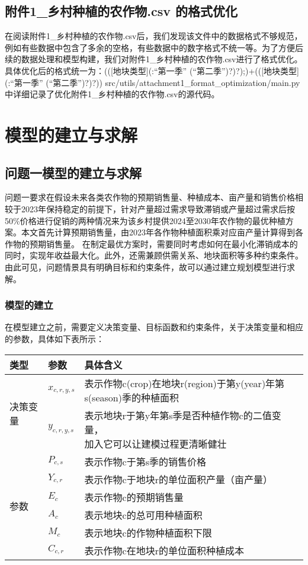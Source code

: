 \documentclass{cumcmthesis}
\begin{document}
\subsection{附件1\_乡村种植的农作物.csv 的格式优化}
在阅读附件1\_乡村种植的农作物.csv后，我们发现该文件中的数据格式不够规范，例如有些数据中包含了多余的空格，有些数据中的数字格式不统一等。为了方便后续的数据处理和模型构建，我们对附件1\_乡村种植的农作物.csv进行了格式优化。具体优化后的格式统一为：(([地块类型](:“第一季” (“第二季”)?)?);)+(([地块类型](:“第一季” (“第二季”)?)?))
src/utils/attachment1\_format\_optimization/main.py中详细记录了优化附件1\_乡村种植的农作物.csv的源代码。


\section{模型的建立与求解}
\subsection{问题一模型的建立与求解}
问题一要求在假设未来各类农作物的预期销售量、种植成本、亩产量和销售价格相较于2023年保持稳定的前提下，针对产量超过需求导致滞销或产量超过需求后按50\%价格进行促销的两种情况来为该乡村提供2024至2030年农作物的最优种植方案。本文首先计算预期销售量，由2023年各作物种植面积乘对应亩产量计算得到各作物的预期销售量。
在制定最优方案时，需要同时考虑如何在最小化滞销成本的同时，实现年收益最大化。此外，还需兼顾供需关系、地块面积等多种约束条件。由此可见，问题情景具有明确目标和约束条件，故可以通过建立规划模型进行求解。



\subsubsection{模型的建立}
在模型建立之前，需要定义决策变量、目标函数和约束条件，关于决策变量和相应的参数，具体如下表所示：
\begin{table}[htbp]
    \centering
    \begin{tabular}{|l|l|l|}
        \hline
        类型 & 参数 & 具体含义 \\ \hline
        \multirow{2}{*}{决策变量} & $x_{c,r,y,s}$ & 表示作物c(crop)在地块r(region)于第y(year)年第s(season)季的种植面积 \\ \cline{2-3}
        ~ & $y_{c,r,y,s}$ & \makecell{表示地块r于第y年第s季是否种植作物c的二值变量，\\加入它可以让建模过程更清晰健壮} \\ \hline
        \multirow{6}{*}{\centering 参数} & $P_{c,s}$ & 表示作物c于第s季的销售价格 \\ \cline{2-3}
        ~ & $Y_{c,r}$ & 表示作物c于地块r的单位面积产量（亩产量） \\ \cline{2-3}
        ~ & $E_{c}$ & 表示作物c的预期销售量 \\ \cline{2-3}
        ~ & $A_c$ & 表示地块c的总可用种植面积 \\ \cline{2-3}
        ~ & $M_c$ & 表示地块c的作物种植面积下限 \\ \cline{2-3}
        ~ & $C_{c,r}$ & 表示作物c在地块r的单位面积种植成本 \\ \hline
    \end{tabular}
\end{table}
\end{document}
